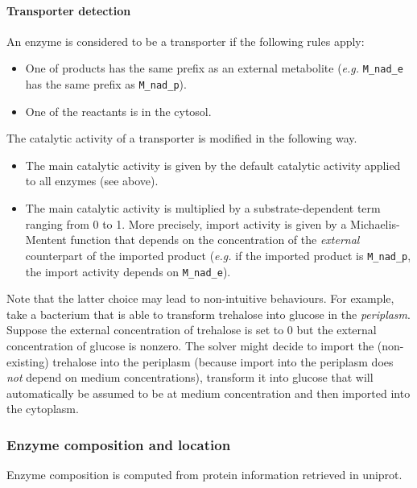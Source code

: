 \paragraph{Transporter detection} An enzyme is considered to be a transporter if the following rules apply:
\begin{itemize}
\item One of products has the same prefix as an external metabolite (\textit{e.g.} \texttt{M\_nad\_e} has the same prefix as \texttt{M\_nad\_p}).
\item One of the reactants is in the cytosol.
\end{itemize}
The catalytic activity of a transporter is modified in the following way.
\begin{itemize}
\item The main catalytic activity is given by the default catalytic activity applied to all enzymes (see above).
\item The main catalytic activity is multiplied by a substrate-dependent term ranging from 0 to 1. More precisely, import activity is given by a Michaelis-Mentent function that depends on the concentration of the \emph{external} counterpart of the imported product (\textit{e.g.} if the imported product is \texttt{M\_nad\_p}, the import activity depends on \texttt{M\_nad\_e}).
\end{itemize}

Note that the latter choice may lead to non-intuitive behaviours. For example, take a bacterium that is able to transform trehalose into glucose in the \emph{periplasm}. Suppose the external concentration of trehalose is set to 0 but the external concentration of glucose is nonzero. The solver might decide to import the (non-existing) trehalose into the periplasm (because import into the periplasm does \emph{not} depend on medium concentrations), transform it into glucose that will automatically be assumed to be at medium concentration and then imported into the cytoplasm.

\subsubsection{Enzyme composition and location}
Enzyme composition is computed from protein information retrieved in uniprot.

